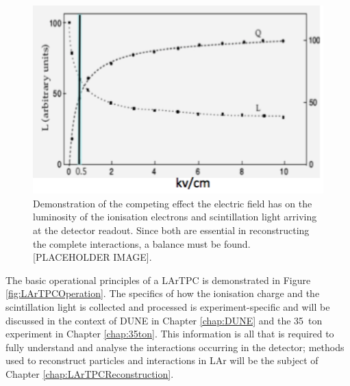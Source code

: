 \begin{figure}
  \centering
  \includegraphics[width=12cm]{ElectricFieldScintillationIonisation.png}
  \caption[Effect of electric field on luminosity of ionisation electrons and scintillation light in a LArTPC.]{Demonstration of the competing effect the electric field has on the luminosity of the ionisation electrons and scintillation light arriving at the detector readout.  Since both are essential in reconstructing the complete interactions, a balance must be found. [PLACEHOLDER IMAGE].}
  \label{fig:ElectricFieldScintillationIonisation}
\end{figure}

The basic operational principles of a LArTPC is demonstrated in Figure \ref{fig:LArTPCOperation}.  The specifics of how the ionisation charge and the scintillation light is collected and processed is experiment-specific and will be discussed in the context of DUNE in Chapter \ref{chap:DUNE} and the 35~ton experiment in Chapter \ref{chap:35ton}.  This information is all that is required to fully understand and analyse the interactions occurring in the detector; methods used to reconstruct particles and interactions in LAr will be the subject of Chapter \ref{chap:LArTPCReconstruction}.

